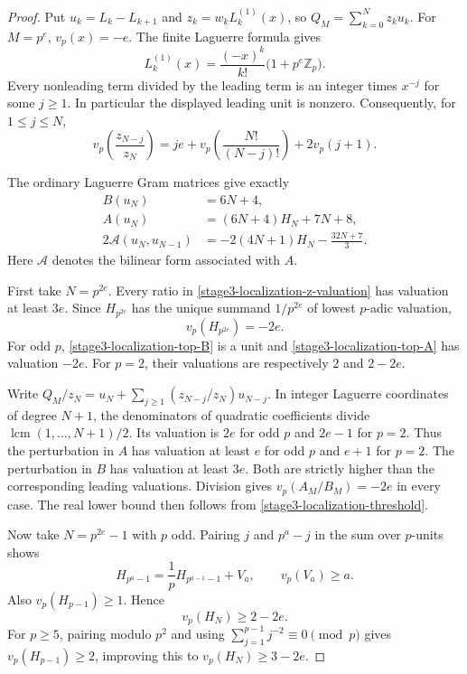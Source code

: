 \documentclass[11pt,a4paper]{article}
\theoremstyle{definition}
\theoremstyle{remark}
\begin{document}
\begin{proof}
Put $u_k=L_k-L_{k+1}$ and $z_k=w_kL_k^{(1)}(x)$, so
$Q_M=\sum_{k=0}^N z_ku_k$. For $M=p^e$,
$v_p(x)=-e$. The finite Laguerre formula gives
\[
 L_k^{(1)}(x)=\frac{(-x)^k}{k!}\bigl(1+p^e\mathbb Z_p\bigr).
\]
Every nonleading term divided by the leading term is an integer times
$x^{-j}$ for some $j\ge1$. In particular the displayed leading unit is
nonzero. Consequently, for $1\le j\le N$,
\begin{equation}
 v_p\!\left(\frac{z_{N-j}}{z_N}\right)
 =je+v_p\!\left(\frac{N!}{(N-j)!}\right)+2v_p(j+1).
 \label{stage3-localization-z-valuation}
\end{equation}

The ordinary Laguerre Gram matrices give exactly
\begin{align}
 B(u_N)&=6N+4,\label{stage3-localization-top-B}\\
 A(u_N)&=(6N+4)H_N+7N+8,\label{stage3-localization-top-A}\\
 2\mathcal A(u_N,u_{N-1})
 &=-2(4N+1)H_N-\frac{32N+7}{3}.
 \label{stage3-localization-adjacent-A}
\end{align}
Here $\mathcal A$ denotes the bilinear form associated with $A$.

First take $N=p^{2e}$. Every ratio in
\eqref{stage3-localization-z-valuation} has valuation at least $3e$.
Since $H_{p^{2e}}$ has the unique summand $1/p^{2e}$ of lowest
$p$-adic valuation,
\[
 v_p(H_{p^{2e}})=-2e.
\]
For odd $p$, \eqref{stage3-localization-top-B} is a unit and
\eqref{stage3-localization-top-A} has valuation $-2e$.
For $p=2$, their valuations are respectively $2$ and $2-2e$.

Write $Q_M/z_N=u_N+\sum_{j\ge1}(z_{N-j}/z_N)u_{N-j}$.
In integer Laguerre coordinates of degree $N+1$, the denominators of
quadratic coefficients divide
$\operatorname{lcm}(1,\ldots,N+1)/2$. Its valuation is $2e$ for odd
$p$ and $2e-1$ for $p=2$. Thus the perturbation in $A$ has valuation at
least $e$ for odd $p$ and $e+1$ for $p=2$. The perturbation in $B$ has
valuation at least $3e$. Both are strictly higher than the corresponding
leading valuations. Division gives $v_p(A_M/B_M)=-2e$ in every case.
The real lower bound then follows from
\eqref{stage3-localization-threshold}.

Now take $N=p^{2e}-1$ with $p$ odd. Pairing $j$ and $p^a-j$ in the
sum over $p$-units shows
\[
 H_{p^a-1}=\frac1pH_{p^{a-1}-1}+V_a,\qquad v_p(V_a)\ge a.
\]
Also $v_p(H_{p-1})\ge1$. Hence
\[
 v_p(H_N)\ge2-2e.
\]
For $p\ge5$, pairing modulo $p^2$ and using
$\sum_{j=1}^{p-1}j^{-2}\equiv0\pmod p$ gives
$v_p(H_{p-1})\ge2$, improving this to $v_p(H_N)\ge3-2e$.


\end{proof}
\end{document}
